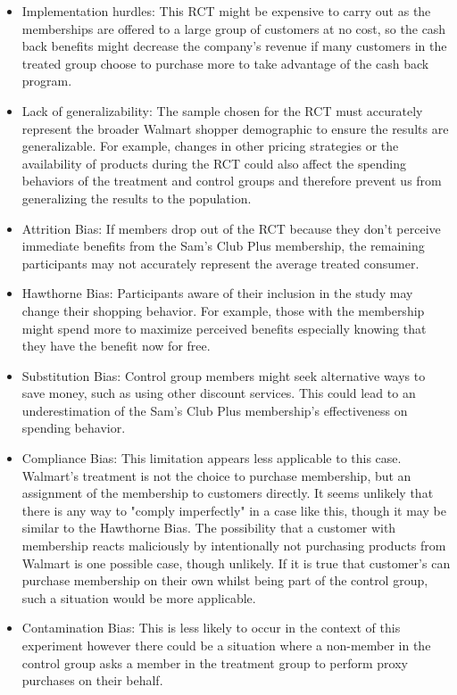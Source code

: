 \documentclass{article}
\begin{document}
\begin{enumerate}[label=\textbf{Q\arabic{enumi}}.,ref=Q\arabic{enumi}, wide=0pt, itemsep=1em, topsep=5pt]
\begin{enumerate}
        \begin{solution}
            {
                \begin{itemize}
                    \item Implementation hurdles: This RCT might be expensive to carry out as the memberships are offered to a large group of customers at no cost, so the cash back benefits might decrease the company's revenue if many customers in the treated group choose to purchase more to take advantage of the cash back program.
                    \item Lack of generalizability: The sample chosen for the RCT must accurately represent the broader Walmart shopper demographic to ensure the results are generalizable. For example, changes in other pricing strategies or the availability of products during the RCT could also affect the spending behaviors of the treatment and control groups and therefore prevent us from generalizing the results to the population.
                    \item Attrition Bias: If members drop out of the RCT because they don't perceive immediate benefits from the Sam's Club Plus membership, the remaining participants may not accurately represent the average treated consumer.
                    \item Hawthorne Bias: Participants aware of their inclusion in the study may change their shopping behavior. For example, those with the membership might spend more to maximize perceived benefits especially knowing that they have the benefit now for free.
                    \item Substitution Bias: Control group members might seek alternative ways to save money, such as using other discount services. This could lead to an underestimation of the Sam's Club Plus membership's effectiveness on spending behavior.
                    \item Compliance Bias: This limitation appears less applicable to this case. Walmart's treatment is not the choice to purchase membership, but an assignment of the membership to customers directly. It seems unlikely that there is any way to "comply imperfectly" in a case like this, though it may be similar to the Hawthorne Bias. The possibility that a customer with membership reacts maliciously by intentionally not purchasing products from Walmart is one possible case, though unlikely. If it is true that customer's can purchase membership on their own whilst being part of the control group, such a situation would be more applicable.
                    \item Contamination Bias: This is less likely to occur in the context of this experiment however there could be a situation where a non-member in the control group asks a member in the treatment group to perform proxy purchases on their behalf.
                \end{itemize}
            
}
\end{solution}
\end{enumerate}
\end{enumerate}
\end{document}

